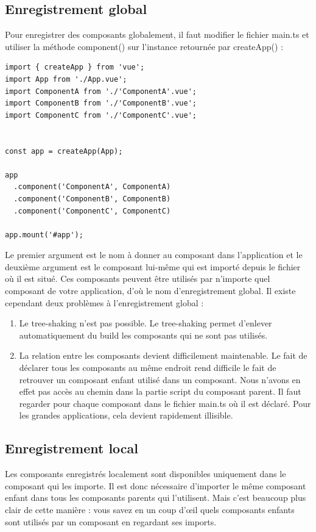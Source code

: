 \documentclass{article}
\begin{document}
\subsection{Enregistrement global}
Pour enregistrer des composants globalement, il faut modifier le fichier {\color{monOrange}main.ts} et utiliser la méthode {\color{monOrange}component()} sur l'instance retournée par {\color{monOrange}createApp()} :
\begin{verbatim}
import { createApp } from 'vue';
import App from './App.vue';
import ComponentA from './'ComponentA'.vue';
import ComponentB from './'ComponentB'.vue';
import ComponentC from './'ComponentC'.vue';


const app = createApp(App);

app
  .component('ComponentA', ComponentA)
  .component('ComponentB', ComponentB)
  .component('ComponentC', ComponentC)

app.mount('#app');
\end{verbatim}
Le premier argument est le nom à donner au composant dans l'application et le deuxième argument est le composant lui-même qui est importé depuis le fichier où il est situé. Ces composants peuvent être utilisés par n'importe quel composant de votre application, d'où le nom d'enregistrement global. Il existe cependant deux problèmes à l'enregistrement global :
\begin{enumerate}
\item  Le {\color{monOrange}tree-shaking} n'est pas possible. Le {\color{monOrange}tree-shaking} permet d'enlever automatiquement du {\color{monOrange}build} les composants qui ne sont pas utilisés.
\item La relation entre les composants devient difficilement maintenable. Le fait de déclarer tous les composants au même endroit rend difficile le fait de retrouver un composant enfant utilisé dans un composant. Nous n'avons en effet pas accès au chemin dans la partie {\color{monOrange}script} du composant parent. Il faut regarder pour chaque composant dans le fichier {\color{monOrange}main.ts} où il est déclaré. Pour les grandes applications, cela devient rapidement illisible.
\end{enumerate}
\subsection{Enregistrement local}
Les composants enregistrés localement sont disponibles uniquement dans le composant qui les importe. Il est donc nécessaire d'importer le même composant enfant dans tous les composants parents qui l'utilisent. Mais c'est beaucoup plus clair de cette manière : vous savez en un coup d'œil quels composants enfants sont utilisés par un composant en regardant ses imports.
\end{document}
